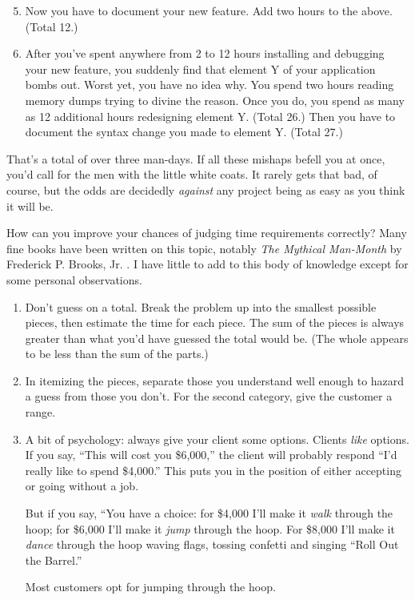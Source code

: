 \begin{enumerate}
    \setcounter{enumi}{4}
\item Now you have to document your new feature. Add two hours to the
above. (Total 12.)
\item After you've spent anywhere from 2 to 12 hours installing and
debugging your new feature, you suddenly find that element Y of your
application bombs out. Worst yet, you have no idea why. You spend two
hours reading memory dumps trying to divine the reason. Once you do,
you spend as many as 12 additional hours redesigning element Y. (Total
26.) Then you have to document the syntax change you made to element
Y. (Total 27.)
\end{enumerate}

\noindent That's a total of over three man-days. If all these mishaps
befell you at once, you'd call for the men with the little white
coats. It rarely gets that bad, of course, but the odds are decidedly
\emph{against} any project being as easy as you think it will be.

How can you improve your chances of judging time requirements
correctly? Many fine books have been written on this topic, notably
\emph{The Mythical Man-Month} by Frederick P. Brooks, Jr. \cite{brooks75}.
I have little to add to this body of knowledge except for some
personal observations.

\begin{enumerate}

\item Don't guess on a total. Break the problem up into the smallest possible
pieces, then estimate the time for each piece. The sum of the pieces is
always greater than what you'd have guessed the total would be. (The
whole appears to be less than the sum of the parts.)

\item In itemizing the pieces, separate those you understand well enough to
hazard a guess from those you don't. For the second category, give the
customer a range.

\item A bit of psychology: always give your client some options.
Clients \emph{like} options. If you say, ``This will cost you \$6,000,''
the client will probably respond ``I'd really like to spend \$4,000.''
This puts you in the position of either accepting or going without a job.

But if you say, ``You have a choice: for \$4,000 I'll make it
\emph{walk} through the hoop; for \$6,000 I'll make it \emph{jump}
through the hoop. For \$8,000 I'll make it \emph{dance} through the
hoop waving flags, tossing confetti and singing ``Roll Out the Barrel.''

Most customers opt for jumping through the hoop.
\end{enumerate}

